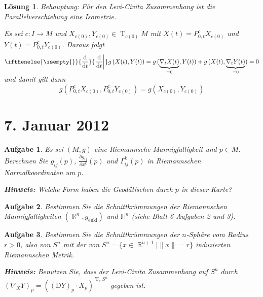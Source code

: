 \documentclass[paper=A4, twoside, chapterprefix=true, bibliography=totoc, headsepline]{scrbook}
\DeclareMathOperator{\R}{\mathbb{R}}
\DeclareMathOperator{\T}{T}         %
\newcommand{\dop}{\mathrm{d}}
\newcommand{\difffrac}[3][]{\ifthenelse{\isempty{#1}}{\frac{\dop #2}{\dop #3}}{\left. \frac{\dop #2}{\dop #3} \right|_{#1}}}
\theoremstyle{plain}
\theoremstyle{nonumberplain}
\theoremstyle{empty}
\theoremstyle{break}
\newtheorem{Aufg}{Aufgabe}
\newtheorem{Loes}{L\"osung}
\begin{document}
\begin{Loes}
\emph{Behauptung:} F\"ur den Levi-Civita Zusammenhang ist die Parallelverschiebung eine Isometrie.

Es sei $c: I \to M$ und $X_{c(0)}, Y_{c(0)} \in \T_{c(0)}M$ mit $X(t) = P_{0,t}^c X_{c(0)}$ und $Y(t) = P_{0,t}^c Y_{c(0)}$. Daraus folgt
	\[ \difffrac{}{t} g\left(X(t), Y(t)\right) = g\left( \smash{\underbrace{\nabla_tX(t)}_{=0}}, Y(t) \right) + g \left( X(t), \smash{\underbrace{\nabla_t Y(t)}_{=0}} \right) = 0\]
und damit gilt dann
	\[ g \left( P_{0,t}^c X_{c(0)}, P_{0,t}^c Y_{c(0)} \right) = g \left( X_{c(0)}, Y_{c(0)} \right) \]
\end{Loes}


\section{7. Januar 2012}
\setcounter{Aufg}{0} %
\setcounter{Loes}{0}

\begin{Aufg}
Es sei $(M,g)$ eine Riemannsche Mannigfaltigkeit und $p\in M$. Berechnen Sie $g_{ij}(p)$, $\frac{\partial g_{ij}}{\partial x^k}(p)$  und $\Gamma_{ij}^k(p)$ in Riemannschen Normalkoordinaten um $p$.

{\footnotesize \textbf{Hinweis:} Welche Form haben die Geodätischen durch $p$ in dieser Karte?}
\end{Aufg}

\begin{Aufg}
Bestimmen Sie die Schnittkrümmungen der Riemannschen Mannigfaltigkeiten $(\R^n,g_{\mathrm{eukl}})$ und $\mathbb{H}^n$ (siehe Blatt 6 Aufgaben 2 und 3).
\end{Aufg}

\begin{Aufg}
Bestimmen Sie die Schnittkrümmungen der $n$-Sphäre vom Radius $r>0$, also von $S^n$ mit der von $S^n=\{x \in \R^{n+1} \mid \|x\|=r\}$ induzierten Riemannschen Metrik.

{\footnotesize \textbf{Hinweis:} Benutzen Sie, dass der Levi-Civita Zusammenhang auf $S^n$  durch $(\nabla_X Y)_p=((\mathrm{D} Y)_p \cdot X_p)^{\T_p S^n}$ gegeben ist.}
\end{Aufg}
\end{document}

